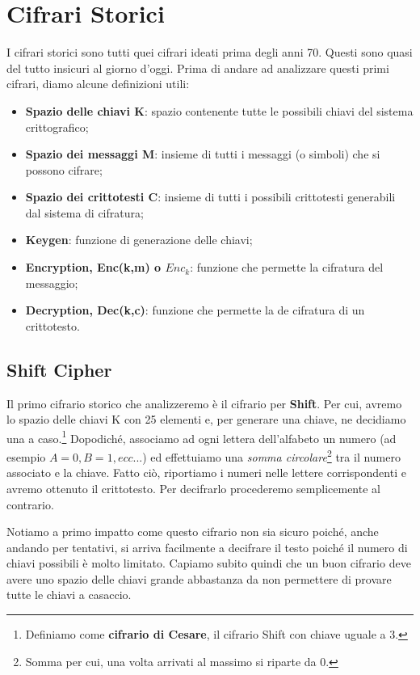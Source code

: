 \chapter{Cifrari Storici}

I cifrari storici sono tutti quei cifrari ideati prima degli anni 70. Questi sono quasi del tutto insicuri al giorno d'oggi. Prima di andare ad analizzare questi primi cifrari, diamo alcune definizioni utili:
\begin{itemize}
    \item \textbf{Spazio delle chiavi K}: spazio contenente tutte le possibili chiavi del sistema crittografico;
    \item \textbf{Spazio dei messaggi M}: insieme di tutti i messaggi (o simboli) che si possono cifrare;
    \item \textbf{Spazio dei crittotesti C}: insieme di tutti i possibili crittotesti generabili dal sistema di cifratura;
    \item \textbf{Keygen}: funzione di generazione delle chiavi;
    \item \textbf{Encryption, Enc(k,m) o $Enc_k$}: funzione che permette la cifratura del messaggio;
    \item \textbf{Decryption, Dec(k,c)}: funzione che permette la de cifratura di un crittotesto. 
\end{itemize}

\section{Shift Cipher}
Il primo cifrario storico che analizzeremo è il cifrario per \textbf{Shift}. Per cui, avremo lo spazio delle chiavi K con 25 elementi e, per generare una chiave, ne decidiamo una a caso.\footnote{Definiamo come \textbf{cifrario di Cesare}, il cifrario Shift con chiave uguale a 3.} Dopodiché, associamo ad ogni lettera dell'alfabeto un numero (ad esempio $A=0, B=1, ecc...$) ed effettuiamo una \textit{somma circolare}\footnote{Somma per cui, una volta arrivati al massimo si riparte da 0.} tra il numero associato e la chiave. Fatto ciò, riportiamo i numeri nelle lettere corrispondenti e avremo ottenuto il crittotesto. Per decifrarlo procederemo semplicemente al contrario. 

Notiamo a primo impatto come questo cifrario non sia sicuro poiché, anche andando per tentativi, si arriva facilmente a decifrare il testo poiché il numero di chiavi possibili è molto limitato. Capiamo subito quindi che un buon cifrario deve avere uno spazio delle chiavi grande abbastanza da non permettere di provare tutte le chiavi a casaccio. 

